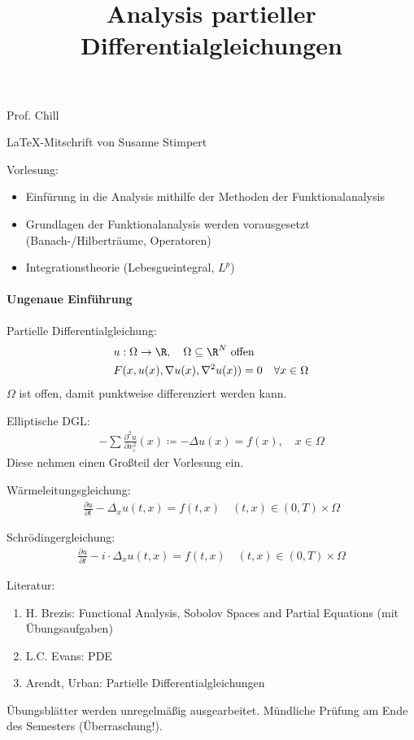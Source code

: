 \documentclass[a4paper, fleqn]{scrartcl}
\title{Analysis partieller Differentialgleichungen}
\begin{document}
\maketitle

\begin{center}
Prof. Chill

\LaTeX-Mitschrift von Susanne Stimpert
\end{center}

Vorlesung:
\begin{itemize}
\item Einfürung in die Analysis mithilfe der Methoden der Funktionalanalysis
\item Grundlagen der Funktionalanalysis werden vorausgesetzt (Banach-/Hilberträume, Operatoren)
\item Integrationstheorie (Lebesgueintegral, $L^{p}$)
\end{itemize}


\paragraph{Ungenaue Einführung}
Partielle Differentialgleichung: 
\begin{align*}
  & u: \Omega \to \R, \quad \Omega \subseteq \R^{N} \text{ offen}\\
  & F(x, u(x), \nabla u(x), \nabla^{2} u(x)) = 0 \quad \forall x \in \Omega
\end{align*}
$\Omega$ ist offen, damit punktweise differenziert werden kann. 

Elliptische DGL:
\begin{align*}
 - \sum \frac{\partial^{2}u}{ \partial x_{i}^{2}}(x) \coloneqq - \Delta u(x) = f(x), \quad x \in \Omega
\end{align*}
Diese nehmen einen Großteil der Vorlesung ein. 

Wärmeleitungsgleichung: 
\begin{align*}
  \frac{\partial u}{\partial t} - \Delta_{x} u(t, x) = f(t, x) \quad (t, x) \in (0, T) \times \Omega
\end{align*}

Schrödingergleichung:
\begin{align*}
  \frac{\partial u}{\partial t} - i\cdot\Delta_{x} u(t, x) = f(t, x) \quad (t, x) \in (0, T) \times \Omega
\end{align*}

Literatur:
\begin{enumerate}
\item  H. Brezis: Functional Analysis, Sobolov Spaces and Partial Equations (mit Übungsaufgaben)
\item L.C. Evans: PDE
\item Arendt, Urban: Partielle Differentialgleichungen
\end{enumerate}
Übungsblätter werden unregelmäßig ausgearbeitet. Mündliche Prüfung am Ende des Semesters (Überraschung!). 
\end{document}
